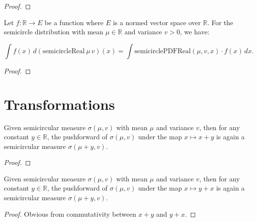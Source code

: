 \begin{proof}
\leanok
\end{proof}

\begin{lemma}
  \label{lem:integral_semicircleReal_eq_integral_smul}
  \leanok

  Let $ f : \mathbb{R} \to E $ be a function where $ E $ is a normed vector space over $\mathbb{R}$. For the semicircle distribution with mean $\mu \in \mathbb{R}$ and variance $ v > 0 $, we have:

  \[
  \int f(x) \, d(\mathrm{semicircleReal}\ \mu\, v)(x) = \int \mathrm{semicirclePDFReal}(\mu, v, x) \cdot f(x) \, dx.
  \]


\end{lemma}

\begin{proof}
\leanok
\end{proof}



\section{Transformations}

\begin{lemma}
  \label{lem:semicircleReal_map_add_const}
  \leanok
  Given semicircular measure $\sigma(\mu, v)$ with mean $\mu$ and variance $v$, then for any constant $y \in \mathbb{R}$, the pushforward
  of $\sigma(\mu, v)$ under the map $x \mapsto x + y$ is again a semicircular measure $\sigma(\mu + y, v)$.
  \begin{proof}
  \end{proof}
\end{lemma}


\begin{lemma}
  \label{lem:semicircleReal_map_const_add}
  \leanok
  Given semicircular measure $\sigma(\mu, v)$ with mean $\mu$ and variance $v$, then for any constant $y \in \mathbb{R}$, the pushforward
  of $\sigma(\mu, v)$ under the map $x \mapsto y + x$ is again a semicircular measure $\sigma(\mu + y, v)$.
  \begin{proof}
    Obvious from commutativity between $x + y$ and $y + x$.
  \end{proof}
\end{lemma}


